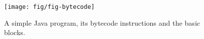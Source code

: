 \begin{figure}[!ht]
\begin{center}
\texttt{[image: fig/fig-bytecode]}
\caption{A simple Java program, its bytecode instructions and the
basic blocks.}\label{fig-bytecode}
\end{center}
\end{figure}


\begin{comment}
\scriptsize
\begin{tabular}{lll}
\begin{minipage}{0.3\textwidth}
\begin{verbatim}

01 public class Vet {
02     int v[];
03     float out;
04
05     float average( int[] in )
06     {
07         v = in;
08         out = 0.0f;
09         int i = 0;
10         try {
11             while ( i < v.length )
12             {
13                 out += v[i];
14                 i++;
15             }
16             out = out / i;
17         }
18         catch( Exception e )
19         {
20             out = 0.0f;
21             i = 0;
22         }
23         finally
24         {
25             v = null;
26         }
27         print( (float) i );
28         return out;
29     }
30
31     public void print( float n )
32     {
33         System.out.print( n + "\n" );
34     }
35 }

\end{verbatim}
\end{minipage}
&
\begin{minipage}{0.3\textwidth}
\begin{verbatim}
0:    aload_0
1:    aload_1
2:    putfield      Vet.v
5:    aload_0
6:    fconst_0
7:    putfield      Vet.out
10:   iconst_0
11:   istore_2
12:   goto          #34
15:   aload_0
16:   dup
17:   getfield      Vet.out
20:   aload_0
21:   getfield      Vet.v
24:   iload_2
25:   iaload
26:   i2f
27:   fadd
28:   putfield      Vet.out
31:   iinc          %2    1
34:   iload_2
35:   aload_0
36:   getfield      Vet.v
39:   arraylength
40:   if_icmplt     #15
43:   aload_0
44:   aload_0
45:   getfield      Vet.out
48:   iload_2
49:   i2f
50:   fdiv
51:   putfield      Vet.out
54:   jsr           #82
57:   goto          #91
60:   astore_3
61:   aload_0
62:   fconst_0
63:   putfield      Vet.out
66:   iconst_0
67:   istore_2
68:   jsr           #82
71:   goto          #91
74:   astore        %4
76:   jsr           #82
79:   aload         %4
81:   athrow
82:   astore        %5
84:   aload_0
85:   aconst_null
86:   putfield      Vet.v
89:   ret           %5
91:   aload_0
92:   iload_2
93:   i2f
94:   invokevirtual Vet.print
97:   aload_0
98:   getfield      Vet.out
101:  freturn
\end{verbatim}
\end{minipage}
\end{tabular}
\end{center}
\caption{A simple Java program, its bytecode instructions and the basic blocks.}\label{fig-bytecode}
\end{figure}
\end{comment}
